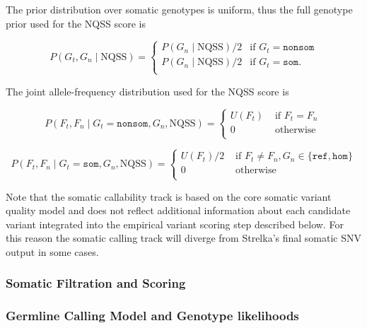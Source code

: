 \documentclass{article}
\begin{document}
The prior distribution over somatic genotypes is uniform, thus the full genotype prior used for the NQSS score is

\begin{equation*}
P(G_t, G_n \mid \text{NQSS}) =
\begin{cases}
P(G_n \mid \text{NQSS})/2 & \text{if } G_t = \texttt{nonsom} \\
P(G_n \mid \text{NQSS})/2 & \text{if } G_t = \texttt{som}. \\
\end{cases}
\end{equation*}


The joint allele-frequency distribution used for the NQSS score is

\begin{equation*}
P(F_t, F_n \mid G_t = \texttt{nonsom}, G_n, \text{NQSS})=
\begin{cases}
U(F_t) & \text{ if } F_t = F_n \\
0 & \text{ otherwise } \\
\end{cases}
\end{equation*}

\begin{equation*}
P(F_t, F_n \mid G_t = \texttt{som}, G_n, \text{NQSS})=
\begin{cases}
U(F_t)/2 & \text{ if } F_t \neq F_n, G_n \in \{\texttt{ref},\texttt{hom}\}  \\
0 & \text{ otherwise } \\
\end{cases}
\end{equation*}

Note that the somatic callability track is based on the core somatic variant quality model and does not reflect additional information about each candidate variant integrated into the empirical variant scoring step described below. For this reason the somatic calling track will diverge from Strelka's final somatic SNV output in some cases.



\subsubsection{Somatic Filtration and Scoring}

\subsubsection{Germline Calling Model and Genotype likelihoods}
\end{document}
